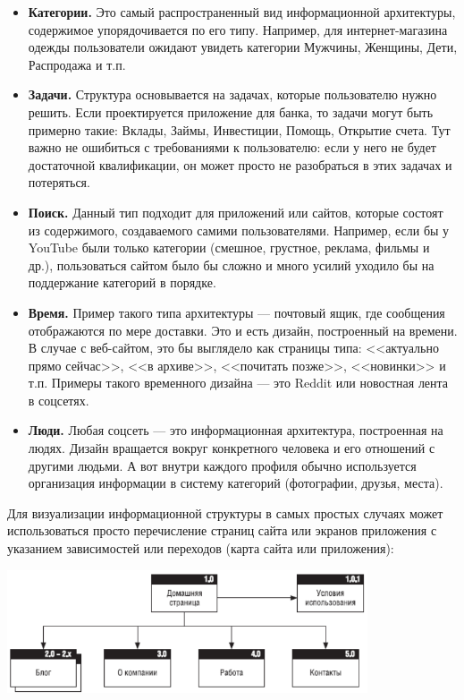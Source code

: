 \documentclass{../../text-style}
\begin{document}
\begin{itemize}
    \item \textbf{Категории.} Это самый распространенный вид информационной архитектуры, содержимое упорядочивается по его типу. Например, для интернет-магазина одежды пользователи ожидают увидеть категории Мужчины, Женщины, Дети, Распродажа и т.п.
    \item \textbf{Задачи.} Структура основывается на задачах, которые пользователю нужно решить. Если проектируется приложение для банка, то задачи могут быть примерно такие: Вклады, Займы, Инвестиции, Помощь, Открытие счета. Тут важно не ошибиться с требованиями к пользователю: если у него не будет достаточной квалификации, он может просто не разобраться в этих задачах и потеряться.
    \item \textbf{Поиск.} Данный тип подходит для приложений или сайтов, которые состоят из содержимого, создаваемого самими пользователями. Например, если бы у YouTube были только категории (смешное, грустное, реклама, фильмы и др.), пользоваться сайтом было бы сложно и много усилий уходило бы на поддержание категорий в порядке.
    \item \textbf{Время.} Пример такого типа архитектуры --- почтовый ящик, где сообщения отображаются по мере доставки. Это и есть дизайн, построенный на времени. В случае с веб-сайтом, это бы выглядело как страницы типа: <<актуально прямо сейчас>>, <<в архиве>>, <<почитать позже>>, <<новинки>> и т.п. Примеры такого временного дизайна --- это Reddit или новостная лента в соцсетях.
    \item \textbf{Люди.} Любая соцсеть --- это информационная архитектура, построенная на людях. Дизайн вращается вокруг конкретного человека и его отношений с другими людьми. А вот внутри каждого профиля обычно используется организация информации в систему категорий (фотографии, друзья, места).
\end{itemize}

Для визуализации информационной структуры в самых простых случаях может использоваться просто перечисление страниц сайта или экранов приложения с указанием зависимостей или переходов (карта сайта или приложения):

\begin{center}
    \includegraphics[width=0.8\textwidth]{informationStructureSmall.png}
\end{center}
\end{document}
